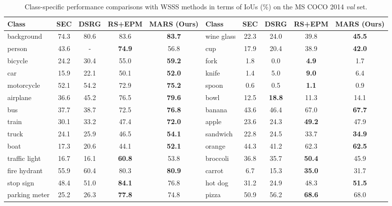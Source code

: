 \documentclass[10pt,twocolumn,letterpaper]{article}
\begin{document}
\begin{table*}[t]
  \centering
  \caption{
    Class-specific performance comparisons with WSSS methods in terms of IoUs (\%) on the MS COCO 2014 \emph{val} set.
  }
  \begin{scriptsize}
  \begin{tabular}{
    p{} c c c c | p{} c c c c}
    \toprule
    Class & SEC \cite{kolesnikov2016seed} & DSRG \cite{huang2018weakly} & RS+EPM \cite{jo2022recurseed} & MARS (Ours) & Class & SEC \cite{kolesnikov2016seed} & DSRG \cite{huang2018weakly} & RS+EPM \cite{jo2022recurseed} & MARS (Ours) \\
    \hline \hline
    background & 74.3 & 80.6 & 83.6 & \textbf{83.7} & wine glass & 22.3 & 24.0 & 39.8 & \textbf{45.5} \\
    person & 43.6 & - & \textbf{74.9} & 56.8 & cup & 17.9 & 20.4 & 38.9 & \textbf{42.0} \\
    bicycle & 24.2 & 30.4 & 55.0 & \textbf{59.2} & fork & 1.8 & 0.0 & \textbf{4.9} & 1.7 \\
    car & 15.9 & 22.1 & 50.1 & \textbf{52.0} & knife & 1.4 & 5.0 & \textbf{9.0} & 6.4 \\
    motorcycle & 52.1 & 54.2 & 72.9 & \textbf{75.2} & spoon & 0.6 & 0.5 & \textbf{1.1} & 0.9 \\
    airplane & 36.6 & 45.2 & 76.5 & \textbf{79.6} & bowl & 12.5 & \textbf{18.8} & 11.3 & 14.1 \\
    bus & 37.7 & 38.7 & 72.5 & \textbf{76.8} & banana & 43.6 & 46.4 & 67.0 & \textbf{67.7} \\
    train & 30.1 & 33.2 & 47.4 & \textbf{72.0} & apple & 23.6 & 24.3 & \textbf{49.2} & 47.9 \\
    truck & 24.1 & 25.9 & 46.5 & \textbf{54.1} & sandwich & 22.8 & 24.5 & 33.7 & \textbf{34.9} \\
    boat & 17.3 & 20.6 & 44.1 & \textbf{52.1} & orange & 44.3 & 41.2 & 62.3 & \textbf{62.5} \\
    traffic light & 16.7 & 16.1 & \textbf{60.8} & 53.8 & broccoli & 36.8 & 35.7 & \textbf{50.4} & 45.9 \\
    fire hydrant & 55.9 & 60.4 & 80.3 & \textbf{80.9} & carrot & 6.7 & 15.3 & \textbf{35.0} & 31.7 \\
    stop sign & 48.4 & 51.0 & \textbf{84.1} & 76.8 & hot dog & 31.2 & 24.9 & 48.3 & \textbf{51.5} \\
    parking meter & 25.2 & 26.3 & \textbf{77.8} & 74.8 & pizza & 50.9 & 56.2 & \textbf{68.6} & 68.0 \\

\end{tabular}
\end{scriptsize}
\end{table*}
\end{document}

